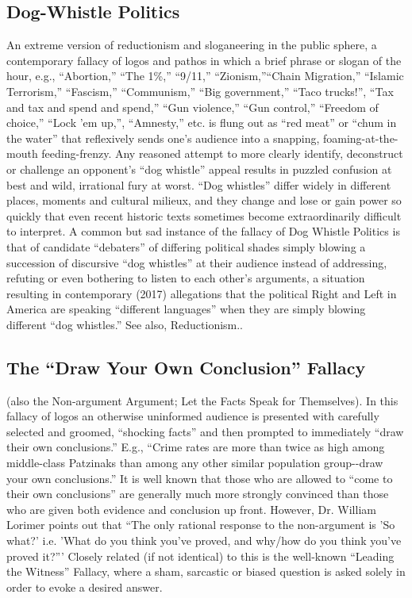 \documentclass[10pt,a4paper,british]{article}
\begin{document}
\begin{multicols}{2}
    \subsection{Dog{-}Whistle Politics} An extreme version of reductionism and
    sloganeering in the public sphere, a contemporary fallacy of logos and
    pathos in which a brief phrase or slogan of the hour, e.g., ``Abortion,''
    ``The 1\%,'' ``9/11,'' ``Zionism,''``Chain Migration,'' ``Islamic
    Terrorism,'' ``Fascism,'' ``Communism,'' ``Big government,'' ``Taco
    trucks!'', ``Tax and tax and spend and spend,'' ``Gun violence,'' ``Gun
    control,'' ``Freedom of choice,'' ``Lock 'em up,'', ``Amnesty,'' etc. is
    flung out as ``red meat'' or ``chum in the water'' that reflexively sends
    one's audience into a snapping, foaming{-}at{-}the{-}mouth
    feeding{-}frenzy. Any reasoned attempt to more clearly identify,
    deconstruct or challenge an opponent's ``dog whistle'' appeal results in
    puzzled confusion at best and wild, irrational fury at worst. ``Dog
    whistles'' differ widely in different places, moments and cultural milieux,
    and they change and lose or gain power so quickly that even recent historic
    texts sometimes become extraordinarily difficult to interpret. A common but
    sad instance of the fallacy of Dog Whistle Politics is that of  candidate
    ``debaters'' of differing political shades simply blowing a succession of
    discursive ``dog whistles'' at their audience instead of addressing,
    refuting or even bothering to listen to each other's arguments, a situation
    resulting in contemporary (2017) allegations that the political Right and
    Left in America are speaking ``different languages'' when they are simply
    blowing different ``dog whistles.'' See also, Reductionism..

	\subsection{The ``Draw Your Own Conclusion'' Fallacy} (also the
	Non{-}argument Argument; Let the Facts Speak for Themselves). In this
	fallacy of logos an otherwise uninformed audience is presented with
	carefully selected and groomed, ``shocking facts'' and then prompted to
	immediately ``draw their own conclusions.'' E.g., ``Crime rates are more
	than twice as high among middle{-}class Patzinaks than among any other
	similar population group{-}{-}draw your own conclusions.'' It is well known
	that those who are allowed to ``come to their own conclusions'' are
	generally much more strongly convinced than those who are given both
	evidence and conclusion up front. However, Dr. William Lorimer points out
	that ``The only rational response to the non{-}argument is 'So what?' i.e.
	'What do you think you've proved, and why/how do you think you've proved
	it?''' Closely related (if not identical) to this is the well{-}known
	``Leading the Witness'' Fallacy, where a sham, sarcastic or biased question
	is asked solely in order to evoke a desired answer.


\end{multicols}
\end{document}
